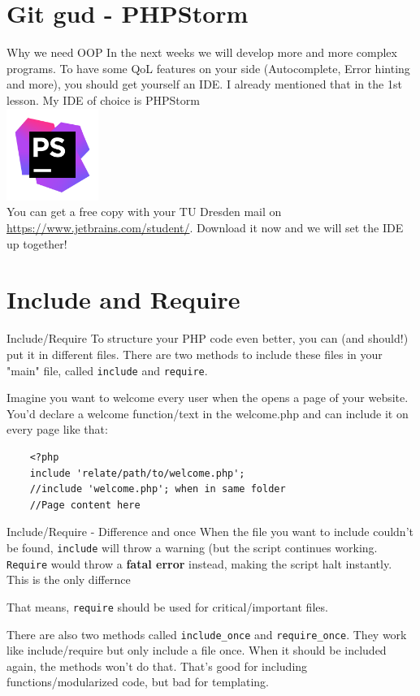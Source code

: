 \section{Git gud - PHPStorm}
\begin{frame}{Why we need OOP}
	In the next weeks we will develop more and more complex programs. \pause To have some QoL features on your side (Autocomplete, Error hinting and more), you should get yourself an IDE. I already mentioned that in the 1st lesson. \pause My IDE of choice is PHPStorm
	\\\includegraphics[width=3cm]{img/phpstorm.png}\\
	You can get a free copy with your TU Dresden mail on \url{https://www.jetbrains.com/student/}. Download it now and we will set the IDE up together!
\end{frame}

\section{Include and Require}
\begin{frame}[fragile]{Include/Require}
	To structure your PHP code even better, you can (and should!) put it in different files. There are two methods to include these files in your "main" file, called \texttt{include} and \texttt{require}.
	
Imagine you want to welcome every user when the opens a page of your website. You'd declare a welcome function/text in the welcome.php and can include it on every page like that: \pause
	\begin{lstlisting}
	<?php
	include 'relate/path/to/welcome.php';
	//include 'welcome.php'; when in same folder
	//Page content here
	\end{lstlisting}
\end{frame}

\begin{frame}[fragile]{Include/Require - Difference and once}
When the file you want to include couldn't be found, \texttt{include} will throw a warning (but the script continues working. \texttt{Require} would throw a \textbf{fatal error} instead, making the script halt instantly. This is the only differnce \pause

That means, \texttt{require} should be used for critical/important files. \pause

There are also two methods called \texttt{include\_{}once} and \texttt{require\_{}once}. They work like include/require but only include a file once. When it should be included again, the methods won't do that. That's good for including functions/modularized code, but bad for templating.
\end{frame}

